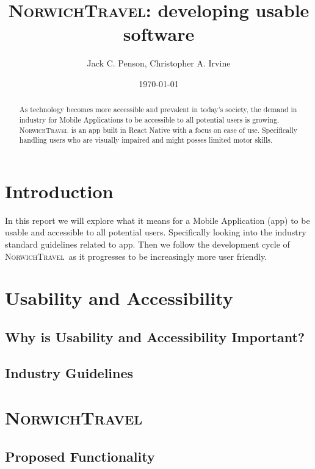 \documentclass{ueacmpstyle}
\newcommand{\nt}{\textsc{NorwichTravel}}
\begin{document}
	\title{\nt: developing usable software}
	\author{Jack C. Penson, Christopher A. Irvine}
	\date{\today}
	\maketitle
	\begin{abstract}
		As technology becomes more accessible and prevalent in today's society, the demand in industry for Mobile Applications to be accessible to all potential users is growing. \nt \ is an app built in React Native with a focus on ease of use. Specifically handling users who are visually impaired and might posses limited motor skills. %
	\end{abstract}
	\section{Introduction}
	In this report we will explore what it means for a Mobile Application (app) to be usable and accessible to all potential users. Specifically looking into the industry standard guidelines related to app. Then we follow the development cycle of \nt \ as it progresses to be increasingly more user friendly. 
	
	\section{Usability and Accessibility}
	
		\subsection{Why is Usability and Accessibility Important?}
		
		\subsection{Industry Guidelines}
	\section{\nt}
	
		\subsection{Proposed Functionality}
		
\end{document}
